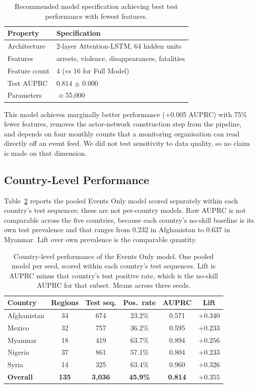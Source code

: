 \documentclass[pdflatex,sn-mathphys-num]{sn-jnl}%
\theoremstyle{thmstyleone}%
\theoremstyle{thmstyletwo}%
\theoremstyle{thmstylethree}%
\begin{document}
\begin{table}[h]
\centering
\caption{Recommended model specification achieving best test performance with fewest features.}
\label{tab:recommended}
\small
\begin{tabular}{ll}
\toprule
\textbf{Property} & \textbf{Specification} \\
\midrule
Architecture & 2-layer Attention-LSTM, 64 hidden units \\
Features & arrests, violence, disappearances, fatalities \\
Feature count & 4 (vs 16 for Full Model) \\
Test AUPRC & 0.814 $\pm$ 0.000 \\
Parameters & ${\approx}$55,000 \\
\bottomrule
\end{tabular}
\end{table}

This model achieves marginally better performance (+0.005 AUPRC) with 75\% fewer features, removes the actor-network construction step from the pipeline, and depends on four monthly counts that a monitoring organisation can read directly off an event feed. We did not test sensitivity to data quality, so no claim is made on that dimension.

\subsection{Country-Level Performance}

Table~\ref{tab:country} reports the pooled Events Only model scored separately within each country's test sequences; these are not per-country models. Raw AUPRC is not comparable across the five countries, because each country's no-skill baseline is its own test prevalence and that ranges from 0.232 in Afghanistan to 0.637 in Myanmar. Lift over own prevalence is the comparable quantity.

\begin{table}[h]
\centering
\caption{Country-level performance of the Events Only model. One pooled model per seed, scored within each country's test sequences. Lift is AUPRC minus that country's test positive rate, which is the no-skill AUPRC for that subset. Means across three seeds.}
\label{tab:country}
\small
\begin{tabular}{lccccc}
\toprule
\textbf{Country} & \textbf{Regions} & \textbf{Test seq.} & \textbf{Pos.\ rate} & \textbf{AUPRC} & \textbf{Lift} \\
\midrule
Afghanistan & 34 & 674 & 23.2\% & 0.571 & $+0.340$ \\
Mexico & 32 & 757 & 36.2\% & 0.595 & $+0.233$ \\
Myanmar & 18 & 419 & 63.7\% & 0.894 & $+0.256$ \\
Nigeria & 37 & 861 & 57.1\% & 0.804 & $+0.233$ \\
Syria & 14 & 325 & 63.4\% & 0.960 & $+0.326$ \\
\midrule
\textbf{Overall} & \textbf{135} & \textbf{3,036} & \textbf{45.9\%} & \textbf{0.814} & $\mathbf{+0.355}$ \\
\bottomrule
\end{tabular}
\end{table}
\end{document}
